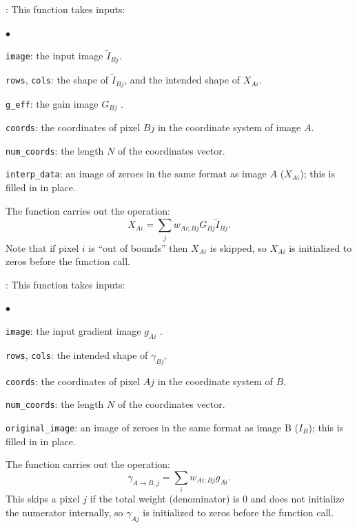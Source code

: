 \documentclass[]{pasj01}
\begin{document}
\vskip 0.1in

: This function takes inputs: 
\begin{list}{$\bullet$}{}
\item {\tt image}: the input image $\tilde I_{Bj}$.
\item {\tt rows}, {\tt cols}: the shape of $\tilde I_{Bj}$, and the intended shape of $X_{Ai}$.
\item {\tt g\_eff}: the gain image $G_{Bj}$ .
\item {\tt coords}: the coordinates of pixel $Bj$ in the coordinate system of image $A$. 
\item {\tt num\_coords}: the length $N$ of the coordinates vector.
\item {\tt interp\_data}: an image of zeroes in the same format as image $A$ ($X_{Ai}$); this is filled in in place.
\end{list}
The function carries out the operation:
\begin{equation}
    X_{Ai} = \sum_j w_{Ai;Bj} G_{Bj} \tilde I_{Bj}.
\end{equation}
Note that if pixel $i$ is ``out of bounds'' then $X_{Ai}$ is skipped, so  $X_{Ai}$ is initialized to zeros before the function call.

\vskip 0.1in

: This function takes inputs: 
\begin{list}{$\bullet$}{}
\item {\tt image}: the input gradient image $g_{Ai}$ .
\item {\tt rows}, {\tt cols}: the intended shape of $\gamma_{Bj}$.
\item {\tt coords}: the coordinates of pixel $Aj$ in the coordinate system of $B$. 
\item {\tt num\_coords}: the length $N$ of the coordinates vector.
\item {\tt original\_image}: an image of zeroes in the same format as image B ($I_{B}$); this is filled in in place.
\end{list}
The function carries out the operation:
\begin{equation}
    \gamma_{A\to B, j} = \sum_i w_{Ai;Bj} g_{Ai}.
\end{equation}
This skips a pixel $j$ if the total weight (denominator) is 0 and does not initialize the numerator internally, so $\gamma_{Aj}$ is initialized to zeros before the function call.
\end{document}
